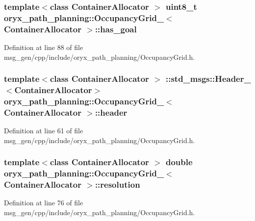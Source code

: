 \subsubsection[{has\-\_\-goal}]{\setlength{\rightskip}{0pt plus 5cm}template$<$class Container\-Allocator $>$ uint8\-\_\-t {\bf oryx\-\_\-path\-\_\-planning\-::\-Occupancy\-Grid\-\_\-}$<$ \-Container\-Allocator $>$\-::{\bf has\-\_\-goal}}\label{structoryx__path__planning_1_1OccupancyGrid___aa03386553c34e1c6234b80b224657fd4}


\-Definition at line 88 of file msg\-\_\-gen/cpp/include/oryx\-\_\-path\-\_\-planning/\-Occupancy\-Grid.\-h.

\subsubsection[{header}]{\setlength{\rightskip}{0pt plus 5cm}template$<$class Container\-Allocator $>$ \-::std\-\_\-msgs\-::\-Header\-\_\-$<$\-Container\-Allocator$>$ {\bf oryx\-\_\-path\-\_\-planning\-::\-Occupancy\-Grid\-\_\-}$<$ \-Container\-Allocator $>$\-::{\bf header}}\label{structoryx__path__planning_1_1OccupancyGrid___a291e1f9ec41d88ef2411cbdfd28bff60}


\-Definition at line 61 of file msg\-\_\-gen/cpp/include/oryx\-\_\-path\-\_\-planning/\-Occupancy\-Grid.\-h.

\subsubsection[{resolution}]{\setlength{\rightskip}{0pt plus 5cm}template$<$class Container\-Allocator $>$ double {\bf oryx\-\_\-path\-\_\-planning\-::\-Occupancy\-Grid\-\_\-}$<$ \-Container\-Allocator $>$\-::{\bf resolution}}\label{structoryx__path__planning_1_1OccupancyGrid___a5cb83f359fd7d382b7a123942d768f52}


\-Definition at line 76 of file msg\-\_\-gen/cpp/include/oryx\-\_\-path\-\_\-planning/\-Occupancy\-Grid.\-h.

